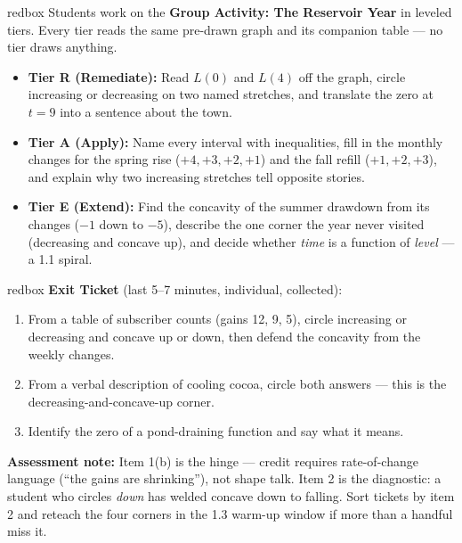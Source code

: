 \documentclass[10pt]{article}
\begin{document}
\begin{skillbox}{redbox}
Students work on the \textbf{Group Activity: The Reservoir Year} in leveled
tiers. Every tier reads the same pre-drawn graph and its companion table ---
no tier draws anything.

\begin{itemize}
  \item \textbf{Tier R (Remediate):} Read $L(0)$ and $L(4)$ off the graph,
        circle increasing or decreasing on two named stretches, and translate
        the zero at $t = 9$ into a sentence about the town.
  \item \textbf{Tier A (Apply):} Name every interval with inequalities, fill
        in the monthly changes for the spring rise ($+4, +3, +2, +1$) and the
        fall refill ($+1, +2, +3$), and explain why two increasing stretches
        tell opposite stories.
  \item \textbf{Tier E (Extend):} Find the concavity of the summer drawdown
        from its changes ($-1$ down to $-5$), describe the one corner the year
        never visited (decreasing and concave up), and decide whether
        \textit{time} is a function of \textit{level} --- a 1.1 spiral.
\end{itemize}
\end{skillbox}

\begin{skillbox}{redbox}
\textbf{Exit Ticket} (last 5--7 minutes, individual, collected):
\begin{enumerate}
  \item From a table of subscriber counts (gains 12, 9, 5), circle increasing
        or decreasing and concave up or down, then defend the concavity from
        the weekly changes.
  \item From a verbal description of cooling cocoa, circle both answers ---
        this is the decreasing-and-concave-up corner.
  \item Identify the zero of a pond-draining function and say what it means.
\end{enumerate}
\textbf{Assessment note:} Item 1(b) is the hinge --- credit requires
rate-of-change language (``the gains are shrinking''), not shape talk. Item 2
is the diagnostic: a student who circles \textit{down} has welded concave down
to falling. Sort tickets by item 2 and reteach the four corners in the 1.3
warm-up window if more than a handful miss it.
\end{skillbox}
\end{document}
